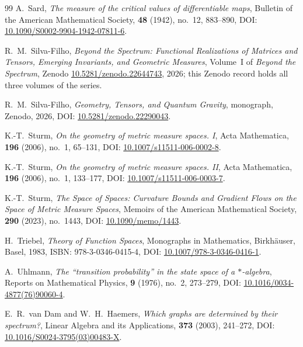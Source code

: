 \documentclass[11pt,a4paper,reqno]{amsart}
\theoremstyle{definition}
\numberwithin{equation}{section}
\begin{document}
\begin{thebibliography}{99}
A.~Sard,
\emph{The measure of the critical values of differentiable maps},
Bulletin of the American Mathematical Society, \textbf{48} (1942), no.~12, 883--890, DOI: \href{https://doi.org/10.1090/S0002-9904-1942-07811-6}{10.1090/S0002-9904-1942-07811-6}.

R.~M.~Silva-Filho,
\emph{Beyond the Spectrum: Functional Realizations of Matrices and Tensors, Emerging Invariants, and Geometric Measures},
Volume~I of \emph{Beyond the Spectrum}, Zenodo \href{https://doi.org/10.5281/zenodo.22644743}{10.5281/zenodo.22644743}, 2026; this Zenodo record holds all three volumes of the series.

R.~M.~Silva-Filho,
\emph{Geometry, Tensors, and Quantum Gravity},
monograph, Zenodo, 2026, DOI: \href{https://doi.org/10.5281/zenodo.22290043}{10.5281/zenodo.22290043}.

K.-T.~Sturm,
\emph{On the geometry of metric measure spaces. I},
Acta Mathematica, \textbf{196} (2006), no.~1, 65--131, DOI: \href{https://doi.org/10.1007/s11511-006-0002-8}{10.1007/s11511-006-0002-8}.

K.-T.~Sturm,
\emph{On the geometry of metric measure spaces. II},
Acta Mathematica, \textbf{196} (2006), no.~1, 133--177, DOI: \href{https://doi.org/10.1007/s11511-006-0003-7}{10.1007/s11511-006-0003-7}.

K.-T.~Sturm,
\emph{The Space of Spaces: Curvature Bounds and Gradient Flows on the Space of Metric Measure Spaces},
Memoirs of the American Mathematical Society, \textbf{290} (2023), no.~1443, DOI: \href{https://doi.org/10.1090/memo/1443}{10.1090/memo/1443}.

H.~Triebel,
\emph{Theory of Function Spaces},
Monographs in Mathematics, Birkh{\"a}user, Basel, 1983, ISBN: 978-3-0346-0415-4, DOI: \href{https://doi.org/10.1007/978-3-0346-0416-1}{10.1007/978-3-0346-0416-1}.

A.~Uhlmann,
\emph{The ``transition probability'' in the state space of a $*$-algebra},
Reports on Mathematical Physics, \textbf{9} (1976), no.~2, 273--279, DOI: \href{https://doi.org/10.1016/0034-4877(76)90060-4}{10.1016/0034-4877(76)90060-4}.

E.~R.~van Dam and W.~H.~Haemers,
\emph{Which graphs are determined by their spectrum?},
Linear Algebra and its Applications, \textbf{373} (2003), 241--272, DOI: \href{https://doi.org/10.1016/S0024-3795(03)00483-X}{10.1016/S0024-3795(03)00483-X}.


\end{thebibliography}
\end{document}
